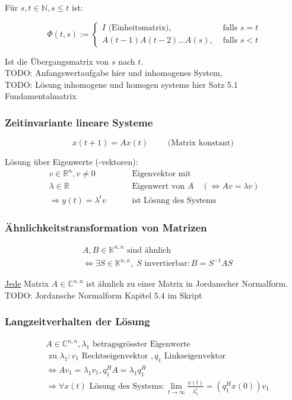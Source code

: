 \documentclass[a4paper]{article}
\newcommand{\R}{\mathbb{R}}
\newcommand{\N}{\mathbb{N}}
\begin{document}
Für $s, t \in \N, s \leq t$ ist:

\[
	\Phi(t, s) := 
	\begin{cases}
		I \text{ (Einheitsmatrix)}, 
		& \text{ falls } s = t \\
		A(t-1) A(t-2) ... A(s),
		& \text{ falls } s < t
	\end{cases}
\] 

Ist die Übergangsmatrix von $s$ nach $t$.
\\

TODO: Anfangswertaufgabe hier und inhomogenes System,
\\

TODO: Lösung inhomogene und homogen systems hier Satz 5.1
Fundamentalmatrix

\subsubsection{Zeitinvariante lineare Systeme}

\[
	x(t+1) = A x(t)
	\qquad \text{ (Matrix konstant) }
\] 

Lösung über Eigenwerte (-vektoren):
\begin{align*}
	v \in \R ^{n}, v \ne 0 \qquad
	& \text{ Eigenvektor mit } \\
	\lambda \in \R \qquad
	& \text{ Eigenwert von } A
	\quad ( \Leftrightarrow  Av = \lambda v ) \\
	\Rightarrow y(t) = \lambda ^{t} v \qquad
	& \text{ ist Lösung des Systems }
\end{align*}

\subsubsection{Ähnlichkeitstransformation von Matrizen}
\begin{align*}
	& A, B \in \mathbb{K} ^{n, n} \text{ sind ähnlich } \\
	& \Leftrightarrow \exists
		S \in \mathbb{K} ^{n,n},\; S \text{ invertierbar} :
		B = S ^{-1} A S
\end{align*}

\underline{Jede} Matrix $A \in \mathbb{C} ^{n,n}$ ist ähnlich
zu einer Matrix in Jordanscher Normalform.
\\

TODO: Jordansche Normalform Kapitel 5.4 im Skript

\subsubsection{Langzeitverhalten der Lösung}
\begin{align*}
	& A \in \mathbb{C} ^{n,n}, \lambda_1 \text{ betragsgrösster Eigenwerte } \\
	& \text{ zu } \lambda_1 : v_1 \text{ Rechtseigenvektor }, q_1
	\text{ Linkseigenvektor } \\
	& \Leftrightarrow A v_1 = \lambda_1 v_1, q_1 ^{H} A = \lambda_1 q_1 ^{H} \\
	&\Rightarrow \forall x(t) \text{ Lösung des Systems}:
	\lim_{t \to \infty} \frac{ x(t) }{ \lambda_1 ^{t} }
	= (q_1 ^{H} x(0)) v_1
\end{align*}
\end{document}
